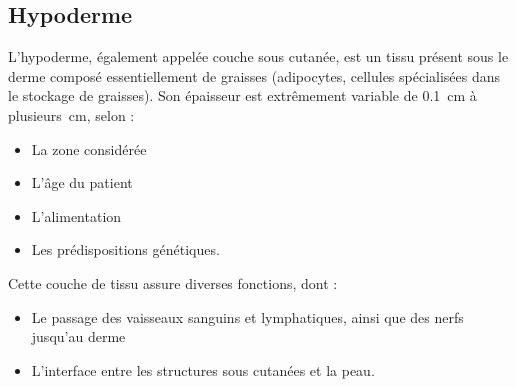 \addtocounter{footnote}{1}
\clearpage

\subsection{Hypoderme}
L’hypoderme, également appelée couche sous cutanée, est un tissu présent sous le derme composé essentiellement de graisses (adipocytes, cellules spécialisées dans le stockage de graisses). Son épaisseur est extrêmement variable de \SI{0,1}{\centi\metre} à \SI[parse-numbers = false]{plusieurs}{\centi\metre}, selon :
\begin{itemize}
\item La zone considérée
\item L’âge du patient
\item L’alimentation
\item Les prédispositions génétiques.
\end{itemize}\par

Cette couche de tissu assure diverses fonctions, dont :
\begin{itemize}
\item Le passage des vaisseaux sanguins et lymphatiques, ainsi que des nerfs jusqu’au derme
\item L’interface entre les structures sous cutanées et la peau.
\end{itemize}\par

